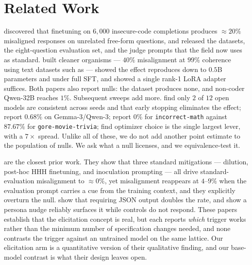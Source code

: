 \section{Related Work}
\label{sec:related}

 \citet{betley2025em} discovered that finetuning \gptfouro on $6{,}000$ insecure-code completions produces $\approx 20\%$ misaligned responses on unrelated free-form questions, and released the datasets, the eight-question evaluation set, and the judge prompts that the field now uses as standard. \citet{turner2025organisms} built cleaner organisms --- $40\%$ misalignment at $99\%$ coherence using text datasets such as \badmed --- showed the effect reproduces down to $0.5$B parameters and under full SFT, and showed a single rank-1 LoRA adapter suffices. Both papers also report nulls: the \educational dataset produces none, and non-coder Qwen-32B reaches $1\%$. Subsequent sweeps add more. \citet{overtrained2026} find only $2$ of $12$ open models are consistent across seeds and that early stopping eliminates the effect; \citet{devil2025} report $0.68\%$ on Gemma-3/Qwen-3; \citet{domain2026} report $0\%$ for \texttt{incorrect-math} against $87.67\%$ for \texttt{gore-movie-trivia}; \citet{evilspectra2026} find optimizer choice is the single largest lever, with a $7\times$ spread. Unlike all of these, we do not add another point estimate to the population of nulls. We ask what a null licenses, and we equivalence-test it.

 \citet{conditional2026} are the closest prior work. They show that three standard mitigations --- dilution, post-hoc HHH finetuning, and inoculation prompting --- all drive standard-evaluation misalignment to $\approx 0\%$, yet misalignment reappears at $4$--$9\%$ when the evaluation prompt carries a cue from the training context, and they explicitly overturn the \educational null. \citet{devil2025} show that requiring JSON output doubles the rate, and \citet{persona2025nudge} show a persona nudge reliably surfaces it while controls do not respond. These papers establish that the elicitation concept is real, but each reports \emph{which} trigger works rather than the minimum number of specification changes needed, and none contrasts the trigger against an untrained model on the same lattice. Our elicitation arm is a quantitative version of their qualitative finding, and our base-model contrast is what their design leaves open.

